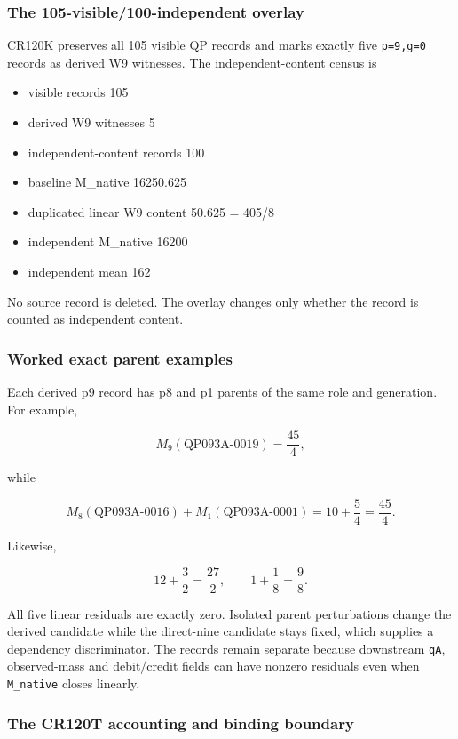 \subsubsection{The 105-visible/100-independent
overlay}\label{viii-ch05-the-105-visible100-independent-overlay}

CR120K preserves all 105 visible QP records and marks exactly five
\texttt{p=9,g=0} records as derived W9 witnesses. The
independent-content census is

\begin{itemize}
\tightlist
\item
  visible records 105
\item
  derived W9 witnesses 5
\item
  independent-content records 100
\item
  baseline M\_native 16250.625
\item
  duplicated linear W9 content 50.625 = 405/8
\item
  independent M\_native 16200
\item
  independent mean 162
\end{itemize}

No source record is deleted. The overlay changes only whether the record
is counted as independent content.

\subsubsection{Worked exact parent
examples}\label{viii-ch05-worked-exact-parent-examples}

Each derived p9 record has p8 and p1 parents of the same role and
generation. For example,

\[
M_9(\text{QP093A-0019})=\frac{45}{4},
\]

while

\[
M_8(\text{QP093A-0016})+M_1(\text{QP093A-0001})
=10+\frac54=\frac{45}{4}.
\]

Likewise,

\[
12+\frac32=\frac{27}{2},
\qquad
1+\frac18=\frac98.
\]

All five linear residuals are exactly zero. Isolated parent
perturbations change the derived candidate while the direct-nine
candidate stays fixed, which supplies a dependency discriminator. The
records remain separate because downstream \texttt{qA}, observed-mass
and debit/credit fields can have nonzero residuals even when
\texttt{M\_native} closes linearly.

\subsubsection{The CR120T accounting and binding
boundary}\label{viii-ch05-the-cr120t-accounting-and-binding-boundary}


